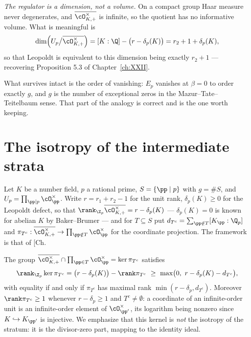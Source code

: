 \begin{summary}
\emph{The regulator is a dimension, not a volume.} On a compact group Haar measure never
degenerates, and $\overline{\cO^\times_{K,+}}$ is infinite, so the quotient has no
informative volume. What is meaningful is
\[
\dim\Bigl(U_p\big/\overline{\cO^\times_{K,+}}\Bigr)=[K:\Q]-\bigl(r-\delta_p(K)\bigr)=r_2+1+\delta_p(K),
\]
so that Leopoldt is equivalent to this dimension being exactly $r_2+1$ --- recovering
Proposition 5.3 of Chapter~\ref{ch:XXII}.

What survives intact is the order of vanishing: $E_p$ vanishes at $\beta=0$ to order exactly
$g$, and $g$ is the number of exceptional zeros in the Mazur--Tate--Teitelbaum sense. That
part of the analogy is correct and is the one worth keeping.
\end{summary}


\section{The isotropy of the intermediate strata}

Let $K$ be a number field, $p$ a rational prime, $S=\{\pp\mid p\}$ with $g=\#S$, and
$U_p=\prod_{\pp\mid p}\cO_\pp^\times$. Write $r=r_1+r_2-1$ for the unit rank, $\delta_p(K)\ge0$
for the Leopoldt defect, so that $\rank_{\Z_p}\overline{\cO^\times_{K,+}}=r-\delta_p(K)$
\cite{Washington} --- $\delta_p(K)=0$ is known for abelian $K$ by Baker--Brumer
\cite{Brumer} --- and
for $T\subseteq S$ put $d_{T^c}=\sum_{\pp\notin T}[K_\pp:\Q_p]$ and
$\pi_{T^c}:\overline{\cO^\times_{K,+}}\to\prod_{\pp\notin T}\cO_\pp^\times$ for the
coordinate projection. The framework is that of [Ch.\begin{proposition}\label{XXIII:prop:rank}
The group $\overline{\cO^\times_{K,+}}\cap\prod_{\pp\in T}\cO_\pp^\times=\ker\pi_{T^c}$
satisfies
\begin{equation}\label{XXIII:eq:rank}
\rank_{\Z_p}\ker\pi_{T^c}
=\bigl(r-\delta_p(K)\bigr)-\rank\pi_{T^c}
\ \ge\ \max\bigl(0,\ r-\delta_p(K)-d_{T^c}\bigr),
\end{equation}
with equality if and only if $\pi_{T^c}$ has maximal rank $\min(r-\delta_p,d_{T^c})$.
Moreover $\rank\pi_{T^c}\ge1$ whenever $r-\delta_p\ge1$ and $T^c\ne\emptyset$: a coordinate
of an infinite-order unit is an infinite-order element of $\cO_{\pp'}^\times$, its logarithm
being nonzero since $K\hookrightarrow K_{\pp'}$ is injective. We emphasize that this kernel
is \emph{not} the isotropy of the stratum: it is the divisor-zero part, mapping to the
identity ideal.
\end{proposition}

